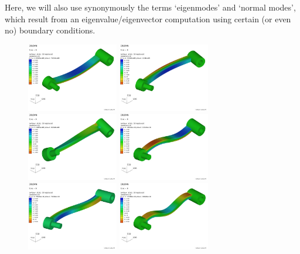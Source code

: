 Here, we will also use synonymously the terms `eigenmodes' and `normal modes', which result from an eigenvalue/eigenvector computation using certain (or even no) boundary conditions.
\begin{figure}[tbph]
  \begin{center}
  \includegraphics[width=4cm]{figures/modesHinge/freeFreeModeStress1}
  \includegraphics[width=4cm]{figures/modesHinge/freeFreeModeStress2}
  \includegraphics[width=4cm]{figures/modesHinge/freeFreeModeStress3}
  \includegraphics[width=4cm]{figures/modesHinge/freeFreeModeStress4}\\
  \includegraphics[width=4cm]{figures/modesHinge/freeFreeModeStress5}
  \includegraphics[width=4cm]{figures/modesHinge/freeFreeModeStress6}

\end{center}
\end{figure}
